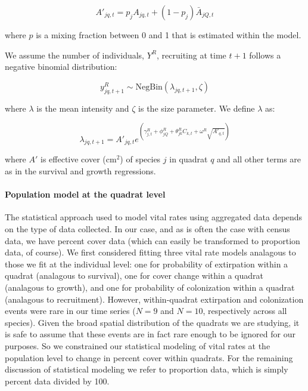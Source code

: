 \documentclass[12pt,]{article}
\begin{document}
\begin{equation}
A'_{jq,t} = p_{j}A_{jq,t} + (1-p_{j})\bar{A}_{jQ,t}
\end{equation}

where $p$ is a mixing fraction between 0 and 1 that is estimated within
the model.

We assume the number of individuals, $Y^{R}$, recruiting at time $t+1$
follows a negative binomial distribution:

\begin{equation}
y^{R}_{jq,t+1} \sim \text{NegBin}(\lambda_{jq,t+1},\zeta)
\end{equation}

where $\lambda$ is the mean intensity and $\zeta$ is the size parameter.
We define $\lambda$ as:

\begin{equation}
\lambda_{jq,t+1} = A'_{jq,t}e^{(\gamma^{R}_{j,t} + \phi^{R}_{jQ} + \theta^{R}_{jk}C_{k,t} + \omega^{R}\sqrt{A'_{q,t}})}
\end{equation}

where $A'$ is effective cover ($\text{cm}^2$) of species $j$ in quadrat
$q$ and all other terms are as in the survival and growth regressions.

\paragraph{Population model at the quadrat
level}\label{population-model-at-the-quadrat-level}

The statistical approach used to model vital rates using aggregated data
depends on the type of data collected. In our case, and as is often the
case with census data, we have percent cover data (which can easily be
transformed to proportion data, of course). We first considered fitting
three vital rate models analagous to those we fit at the individual
level: one for probability of extirpation within a quadrat (analagous to
survival), one for cover change within a quadrat (analagous to growth),
and one for probability of colonization within a quadrat (analagous to
recruitment). However, within-quadrat extirpation and colonization
events were rare in our time series ($N=9$ and $N=10$, respectively
across all species). Given the broad spatial distribution of the
quadrats we are studying, it is safe to assume that these events are in
fact rare enough to be ignored for our purposes. So we constrained our
statistical modeling of vital rates at the population level to change in
percent cover within quadrats. For the remaining discussion of
statistical modeling we refer to proportion data, which is simply
percent data divided by 100.
\end{document}
